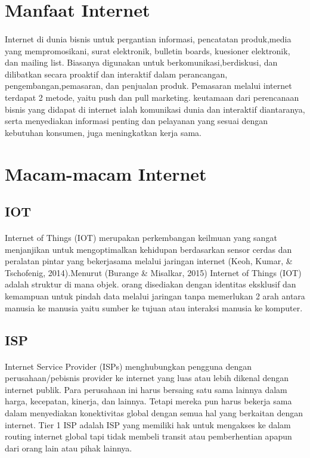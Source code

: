 \documentclass[12pt, a4paper]{article}
\begin{document}
\section{Manfaat Internet}
\paragraph{} Internet di dunia bisnis untuk pergantian informasi, pencatatan produk,media yang mempromosikani, surat elektronik, bulletin boards, kuesioner elektronik, dan mailing list. Biasanya digunakan untuk berkomunikasi,berdiskusi, dan dilibatkan secara proaktif dan interaktif dalam perancangan, pengembangan,pemasaran, dan penjualan produk. Pemasaran melalui internet terdapat 2 metode, yaitu push dan pull marketing. keutamaan dari perencanaan bisnis yang didapat di internet ialah komunikasi dunia dan interaktif diantaranya, serta menyediakan informasi penting dan pelayanan yang sesuai dengan kebutuhan konsumen, juga meningkatkan kerja sama.

\section{Macam-macam Internet}
\subsection{IOT}
\paragraph{} Internet of Things (IOT) merupakan perkembangan keilmuan yang sangat menjanjikan untuk mengoptimalkan kehidupan berdasarkan sensor cerdas dan peralatan pintar yang bekerjasama melalui jaringan internet (Keoh, Kumar, & Tschofenig, 2014).Menurut (Burange & Misalkar, 2015) Internet of Things (IOT) adalah struktur di mana objek. orang disediakan dengan identitas eksklusif dan kemampuan untuk pindah data melalui jaringan tanpa memerlukan 2 arah antara manusia ke manusia yaitu sumber ke tujuan atau interaksi manusia ke komputer.
\subsection{ISP}
\paragraph{} Internet Service Provider (ISPs) menghubungkan pengguna dengan perusahaan/pebisnis provider ke internet yang luas atau lebih dikenal dengan internet publik. Para perusahaan ini harus bersaing satu sama lainnya dalam harga, kecepatan, kinerja, dan lainnya. Tetapi mereka pun harus bekerja sama dalam menyediakan konektivitas global dengan semua hal yang berkaitan dengan internet. Tier 1 ISP adalah ISP yang memiliki hak untuk mengakses ke dalam routing internet global tapi tidak membeli transit atau pemberhentian apapun dari orang lain atau pihak lainnya.
\end{document}
